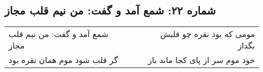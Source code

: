 \begin{center}
\section*{شماره ۲۲: شمع آمد و گفت: من نیم قلب مجاز}
\label{sec:022}
\begin{longtable}{l p{0.5cm} r}
شمع آمد و گفت: من نیم قلب مجاز
&&
مومی که بود نقره چو قلبش بگداز
\\
گر قلب شود موم همان نقره بود
&&
خود موم سر از پای کجا ماند باز
\\
\end{longtable}
\end{center}
